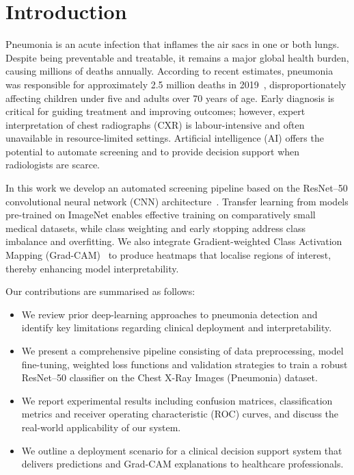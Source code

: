 \documentclass[sigconf]{acmart}
\begin{document}

\maketitle

\section{Introduction}
Pneumonia is an acute infection that inflames the air sacs in one or both lungs. Despite being preventable and treatable, it remains a major global health burden, causing millions of deaths annually. According to recent estimates, pneumonia was responsible for approximately 2.5 million deaths in 2019~\cite{GBD2019}, disproportionately affecting children under five and adults over 70 years of age. Early diagnosis is critical for guiding treatment and improving outcomes; however, expert interpretation of chest radiographs (CXR) is labour-intensive and often unavailable in resource-limited settings. Artificial intelligence (AI) offers the potential to automate screening and to provide decision support when radiologists are scarce.

In this work we develop an automated screening pipeline based on the ResNet--50 convolutional neural network (CNN) architecture~\cite{He2016}. Transfer learning from models pre-trained on ImageNet enables effective training on comparatively small medical datasets, while class weighting and early stopping address class imbalance and overfitting. We also integrate Gradient-weighted Class Activation Mapping (Grad-CAM)~\cite{Selvaraju2017} to produce heatmaps that localise regions of interest, thereby enhancing model interpretability.

Our contributions are summarised as follows:
\begin{itemize}
  \item We review prior deep-learning approaches to pneumonia detection and identify key limitations regarding clinical deployment and interpretability.
  \item We present a comprehensive pipeline consisting of data preprocessing, model fine-tuning, weighted loss functions and validation strategies to train a robust ResNet--50 classifier on the Chest X-Ray Images (Pneumonia) dataset.
  \item We report experimental results including confusion matrices, classification metrics and receiver operating characteristic (ROC) curves, and discuss the real-world applicability of our system.
  \item We outline a deployment scenario for a clinical decision support system that delivers predictions and Grad-CAM explanations to healthcare professionals.
\end{itemize}
\end{document}
